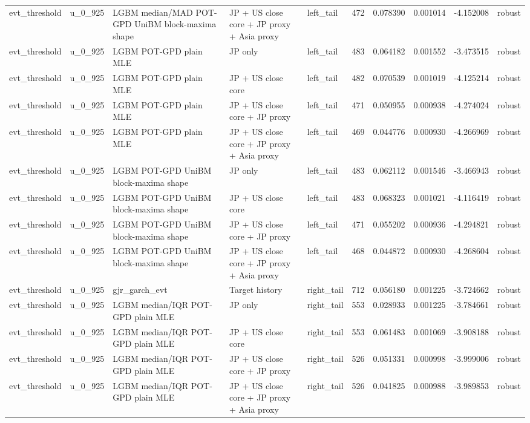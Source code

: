 \begin{tabular}{lll l lrrrrl}
evt\_threshold & u\_0\_925 & LGBM median/MAD POT-GPD UniBM block-maxima shape & JP + US close core + JP proxy + Asia proxy & left\_tail & 472 & 0.078390 & 0.001014 & -4.152008 & robust \\
evt\_threshold & u\_0\_925 & LGBM POT-GPD plain MLE & JP only & left\_tail & 483 & 0.064182 & 0.001552 & -3.473515 & robust \\
evt\_threshold & u\_0\_925 & LGBM POT-GPD plain MLE & JP + US close core & left\_tail & 482 & 0.070539 & 0.001019 & -4.125214 & robust \\
evt\_threshold & u\_0\_925 & LGBM POT-GPD plain MLE & JP + US close core + JP proxy & left\_tail & 471 & 0.050955 & 0.000938 & -4.274024 & robust \\
evt\_threshold & u\_0\_925 & LGBM POT-GPD plain MLE & JP + US close core + JP proxy + Asia proxy & left\_tail & 469 & 0.044776 & 0.000930 & -4.266969 & robust \\
evt\_threshold & u\_0\_925 & LGBM POT-GPD UniBM block-maxima shape & JP only & left\_tail & 483 & 0.062112 & 0.001546 & -3.466943 & robust \\
evt\_threshold & u\_0\_925 & LGBM POT-GPD UniBM block-maxima shape & JP + US close core & left\_tail & 483 & 0.068323 & 0.001021 & -4.116419 & robust \\
evt\_threshold & u\_0\_925 & LGBM POT-GPD UniBM block-maxima shape & JP + US close core + JP proxy & left\_tail & 471 & 0.055202 & 0.000936 & -4.294821 & robust \\
evt\_threshold & u\_0\_925 & LGBM POT-GPD UniBM block-maxima shape & JP + US close core + JP proxy + Asia proxy & left\_tail & 468 & 0.044872 & 0.000930 & -4.268604 & robust \\
evt\_threshold & u\_0\_925 & gjr\_garch\_evt & Target history & right\_tail & 712 & 0.056180 & 0.001225 & -3.724662 & robust \\
evt\_threshold & u\_0\_925 & LGBM median/IQR POT-GPD plain MLE & JP only & right\_tail & 553 & 0.028933 & 0.001225 & -3.784661 & robust \\
evt\_threshold & u\_0\_925 & LGBM median/IQR POT-GPD plain MLE & JP + US close core & right\_tail & 553 & 0.061483 & 0.001069 & -3.908188 & robust \\
evt\_threshold & u\_0\_925 & LGBM median/IQR POT-GPD plain MLE & JP + US close core + JP proxy & right\_tail & 526 & 0.051331 & 0.000998 & -3.999006 & robust \\
evt\_threshold & u\_0\_925 & LGBM median/IQR POT-GPD plain MLE & JP + US close core + JP proxy + Asia proxy & right\_tail & 526 & 0.041825 & 0.000988 & -3.989853 & robust \\

\end{tabular}
